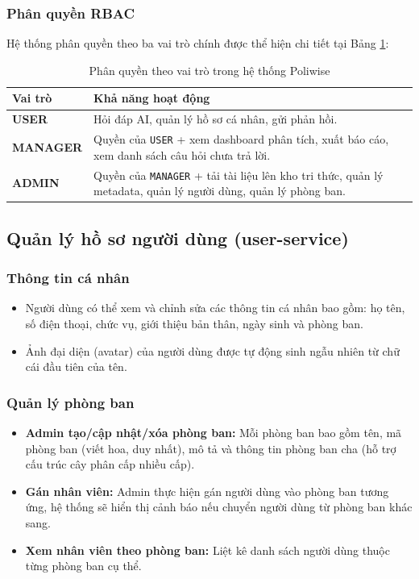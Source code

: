 \documentclass[12pt,a4paper]{report}
\begin{document}
\subsubsection{Phân quyền RBAC}
Hệ thống phân quyền theo ba vai trò chính được thể hiện chi tiết tại Bảng \ref{tab:rbac_roles}:
\begin{table}[H]
\centering
\caption{Phân quyền theo vai trò trong hệ thống Poliwise}
\label{tab:rbac_roles}
\begin{tabularx}{\textwidth}{|l|X|}
\hline
\rowcolor{gray!10}
Vai trò & Khả năng hoạt động \\ \hline
\textbf{USER} & Hỏi đáp AI, quản lý hồ sơ cá nhân, gửi phản hồi. \\ \hline
\textbf{MANAGER} & Quyền của \texttt{USER} + xem dashboard phân tích, xuất báo cáo, xem danh sách câu hỏi chưa trả lời. \\ \hline
\textbf{ADMIN} & Quyền của \texttt{MANAGER} + tải tài liệu lên kho tri thức, quản lý metadata, quản lý người dùng, quản lý phòng ban. \\ \hline
\end{tabularx}
\end{table}

\subsection{Quản lý hồ sơ người dùng (user-service)}

\subsubsection{Thông tin cá nhân}
\begin{itemize}
    \item Người dùng có thể xem và chỉnh sửa các thông tin cá nhân bao gồm: họ tên, số điện thoại, chức vụ, giới thiệu bản thân, ngày sinh và phòng ban.
    \item Ảnh đại diện (avatar) của người dùng được tự động sinh ngẫu nhiên từ chữ cái đầu tiên của tên.
\end{itemize}

\subsubsection{Quản lý phòng ban}
\begin{itemize}
    \item \textbf{Admin tạo/cập nhật/xóa phòng ban:} Mỗi phòng ban bao gồm tên, mã phòng ban (viết hoa, duy nhất), mô tả và thông tin phòng ban cha (hỗ trợ cấu trúc cây phân cấp nhiều cấp).
    \item \textbf{Gán nhân viên:} Admin thực hiện gán người dùng vào phòng ban tương ứng, hệ thống sẽ hiển thị cảnh báo nếu chuyển người dùng từ phòng ban khác sang.
    \item \textbf{Xem nhân viên theo phòng ban:} Liệt kê danh sách người dùng thuộc từng phòng ban cụ thể.
\end{itemize}
\end{document}
